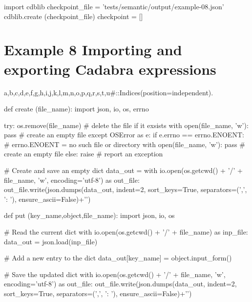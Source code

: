 \documentclass[12pt]{cdblatex}
\begin{document}
\bgroup
{}
\begin{cadabra}
   import cdblib
   checkpoint_file = 'tests/semantic/output/example-08.json'
   cdblib.create (checkpoint_file)
   checkpoint = []
\end{cadabra}
\egroup

\clearpage

\section*{Example 8 Importing and exporting Cadabra expressions}

\begin{cadabra}
   {a,b,c,d,e,f,g,h,i,j,k,l,m,n,o,p,q,r,s,t,u#}::Indices(position=independent).

   def create (file_name):
       import json, io, os, errno

       try:
           os.remove(file_name)                # delete the file if it exsists
           with open(file_name, 'w'): pass     # create an empty file
       except OSError as e:
           if e.errno == errno.ENOENT:         # errno.ENOENT = no such file or directory
              with open(file_name, 'w'): pass  # create an empty file
           else:
               raise                           # report an exception

       # Create and save an empty dict
       data_out = {}
       with io.open(os.getcwd() + '/' + file_name, 'w', encoding='utf-8') as out_file:
           out_file.write(json.dumps(data_out,
                                     indent=2,
                                     sort_keys=True,
                                     separators=(',', ': '),
                                     ensure_ascii=False)+'\n')

   def put (key_name,object,file_name):
       import json, io, os

       # Read the current dict
       with io.open(os.getcwd() + '/' + file_name) as inp_file:
           data_out = json.load(inp_file)

       # Add a new entry to the dict
       data_out[key_name] = object.input_form()

       # Save the updated dict
       with io.open(os.getcwd() + '/' + file_name, 'w', encoding='utf-8') as out_file:
           out_file.write(json.dumps(data_out,
                                     indent=2,
                                     sort_keys=True,
                                     separators=(',', ': '),
                                     ensure_ascii=False)+'\n')


\end{cadabra}
\end{document}
